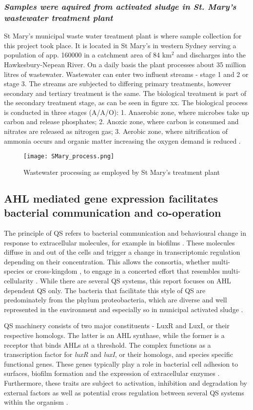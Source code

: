 \documentclass[11pt]{article}
\begin{document}
\subsubsection{\emph{Samples were aquired from activated sludge in St. Mary's wastewater treatment plant}}
St Mary's municipal waste water treatment plant is where sample collection for this project took place. It is located in St Mary's in western Sydney serving a population of app. 160000 in a catchment area of 84 km$^{2}$ and discharges into the Hawkesbury-Nepean River. On a daily basis the plant processes about 35 million litres of wastewater. Wastewater can enter two influent streams - stage 1 and 2 or stage 3. The streams are subjected to differing primary treatments, however secondary and tertiary treatment is the same. The biological treatment is part of the secondary treatment stage, as can be seen in figure xx. The biological process is conducted in three stages (A/A/O): 1. Anaerobic zone, where microbes take up carbon and release phosphates; 2. Anoxic zone, where carbon is consumed and nitrates are released as nitrogen gas; 3. Aerobic zone, where nitrification of ammonia occurs and organic matter increasing the oxygen demand is reduced \cite{stmarys}.
\begin{figure}
\texttt{[image: SMary\_process.png]}
\caption{Wastewater processing as employed by St Mary's treatment plant \cite{stmarys}}
\end{figure}
\FloatBarrier
\subsection{AHL mediated gene expression facilitates bacterial communication and co-operation}
The principle of QS refers to bacterial communication and behavioural change in response to extracellular molecules, for example in biofilms \cite{webb2003}. These molecules diffuse in and out of the cells and trigger a change in transcriptomic regulation depending on their concentration. This allows the consortia, whether multi-species or cross-kingdom \citep{williams2007quorum}, to engage in a concerted effort that resembles multi-cellularity \cite{kjelleberg2002}. While there are several QS systems, this report focuses on AHL dependent QS only. The bacteria that facilitate this style of QS are predominately from the phylum proteobacteria, which are diverse and well represented in the environment and especially so in municipal activated sludge \cite{Hesham_11,Wagner_02}.  


QS machinery consists of two major constituents - LuxR and LuxI, or their respective homologs. The latter is an AHL synthase, while the former is a receptor that binds AHLs at a threshold. The complex functions as a transcription factor for \textit{luxR} and \textit{luxI}, or their homologs, and species specific functional genes. These genes typically play a role in bacterial cell adhesion to surfaces, biofilm formation and the expression of extracellular enzymes \cite{Flemming_10}.
Furthermore, these traits are subject to activation, inhibition and degradation by external factors as well as potential cross regulation between several QS systems within the organism \cite{juhas2005}.
\end{document}
